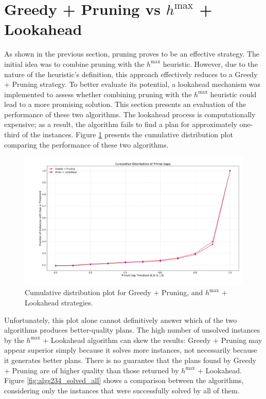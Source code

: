 \section{Greedy + Pruning vs $h^{\max}$ + Lookahead}
As shown in the previous section, pruning proves to be an effective strategy.
The initial idea was to combine pruning with the $h^{\max}$ heuristic. However, due to the nature of the heuristic’s definition,
this approach effectively reduces to a Greedy + Pruning strategy. To better evaluate its potential,
a lookahead mechanism was implemented to assess whether combining pruning with the $h^{\max}$ heuristic could lead
to a more promising solution. This section presents an evaluation of the performance of these two algorithms.
The lookahead process is computationally expensive; as a result, the algorithm fails to find a plan for approximately
one-third of the instances. Figure \ref{fig:algs23} presents the cumulative distribution plot comparing the performance
of these two algorithms.

\begin{figure}[ht]
	\centering
	\includegraphics[width=\textwidth]{images/algs23.png}
	\caption{Cumulative distribution plot for Greedy + Pruning, and $h^{\max}$ + Lookahead strategies.}
	\label{fig:algs23}
\end{figure}

Unfortunately, this plot alone cannot definitively answer which of the two algorithms produces better-quality plans.
The high number of unsolved instances by the $h^{\max}$ + Lookahead algorithm can skew the results: Greedy + Pruning may
appear superior simply because it solves more instances, not necessarily because it generates better plans.
There is no guarantee that the plans found by Greedy + Pruning are of higher quality than those returned by $h^{\max}$ + Lookahead.
Figure \ref{fig:algs234_solved_all} shows a comparison between the algorithms, considering only the instances that were successfully
solved by all of them.

